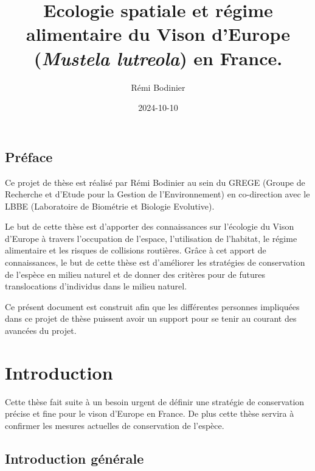 \documentclass[
  letterpaper,
  DIV=11,
  numbers=noendperiod]{scrreprt}
\title{Ecologie spatiale et régime alimentaire du Vison d'Europe
(\emph{Mustela lutreola}) en France.}
\author{Rémi Bodinier}
\date{2024-10-10}
\renewcommand*\contentsname{Table of contents}
\newcommand\contentsname{Table of contents}
\begin{document}
\maketitle

\renewcommand*\contentsname{Table of contents}
{
\hypersetup{linkcolor=}
\setcounter{tocdepth}{2}
\tableofcontents
}


\chapter*{Préface}\label{pruxe9face}


Ce projet de thèse est réalisé par Rémi Bodinier au sein du GREGE
(Groupe de Recherche et d'Etude pour la Gestion de l'Environnement) en
co-direction avec le LBBE (Laboratoire de Biométrie et Biologie
Evolutive).

Le but de cette thèse est d'apporter des connaissances sur l'écologie du
Vison d'Europe à travers l'occupation de l'espace, l'utilisation de
l'habitat, le régime alimentaire et les risques de collisions routières.
Grâce à cet apport de connaissances, le but de cette thèse est
d'améliorer les stratégies de conservation de l'espèce en milieu naturel
et de donner des critères pour de futures translocations d'individus
dans le milieu naturel.

Ce présent document est construit afin que les différentes personnes
impliquées dans ce projet de thèse puissent avoir un support pour se
tenir au courant des avancées du projet.

\part{Introduction}

Cette thèse fait suite à un besoin urgent de définir une stratégie de
conservation précise et fine pour le vison d'Europe en France. De plus
cette thèse servira à confirmer les mesures actuelles de conservation de
l'espèce.

\chapter{Introduction générale}\label{introduction-guxe9nuxe9rale}
\end{document}
